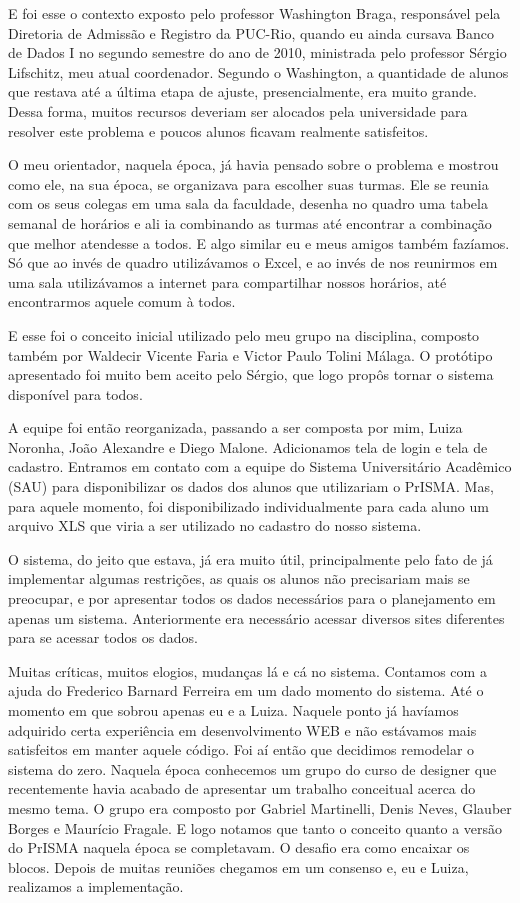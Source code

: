 \documentclass[graduacao,brazil]{ThesisPUC}
\begin{document}
E foi esse o contexto exposto pelo professor Washington Braga, responsável pela Diretoria de Admissão e Registro da PUC-Rio, quando eu ainda cursava Banco de Dados I no segundo semestre do ano de 2010, ministrada pelo professor Sérgio Lifschitz, meu atual coordenador. Segundo o Washington, a quantidade de alunos que restava até a última etapa de ajuste, presencialmente, era muito grande. Dessa forma, muitos recursos deveriam ser alocados pela universidade para resolver este problema e poucos alunos ficavam realmente satisfeitos.

O meu orientador, naquela época, já havia pensado sobre o problema e mostrou como ele, na sua época, se organizava para escolher suas turmas. Ele se reunia com os seus colegas em uma sala da faculdade, desenha no quadro uma tabela semanal de horários e ali ia combinando as turmas até encontrar a combinação que melhor atendesse a todos. E algo similar eu e meus amigos também fazíamos. Só que ao invés de quadro utilizávamos o Excel, e ao invés de nos reunirmos em uma sala utilizávamos a internet para compartilhar nossos horários, até encontrarmos aquele comum à todos.

E esse foi o conceito inicial utilizado pelo meu grupo na disciplina, composto também por Waldecir Vicente Faria e Victor Paulo Tolini Málaga. O protótipo apresentado foi muito bem aceito pelo Sérgio, que logo propôs tornar o sistema disponível para todos.

A equipe foi então reorganizada, passando a ser composta por mim, Luiza Noronha, João Alexandre e Diego Malone. Adicionamos tela de login e tela de cadastro. Entramos em contato com a equipe do Sistema Universitário Acadêmico (SAU) para disponibilizar os dados dos alunos que utilizariam o PrISMA. Mas, para aquele momento, foi disponibilizado individualmente para cada aluno um arquivo XLS que viria a ser utilizado no cadastro do nosso sistema.

O sistema, do jeito que estava, já era muito útil, principalmente pelo fato de já implementar algumas restrições, as quais os alunos não precisariam mais se preocupar, e por apresentar todos os dados necessários para o planejamento em apenas um sistema. Anteriormente era necessário acessar diversos sites diferentes para se acessar todos os dados.

Muitas críticas, muitos elogios, mudanças lá e cá no sistema. Contamos com a ajuda do Frederico Barnard Ferreira em um dado momento do sistema. Até o momento em que sobrou apenas eu e a Luiza. Naquele ponto já havíamos adquirido certa experiência em desenvolvimento WEB e não estávamos mais satisfeitos em manter aquele código. Foi aí então que decidimos remodelar o sistema do zero. Naquela época conhecemos um grupo do curso de designer que recentemente havia acabado de apresentar um trabalho conceitual acerca do mesmo tema. O grupo era composto por Gabriel Martinelli, Denis Neves, Glauber Borges e Maurício Fragale. E logo notamos que tanto o conceito quanto a versão do PrISMA naquela época se completavam. O desafio era como encaixar os blocos. Depois de muitas reuniões chegamos em um consenso e, eu e Luiza, realizamos a implementação.
\end{document}
